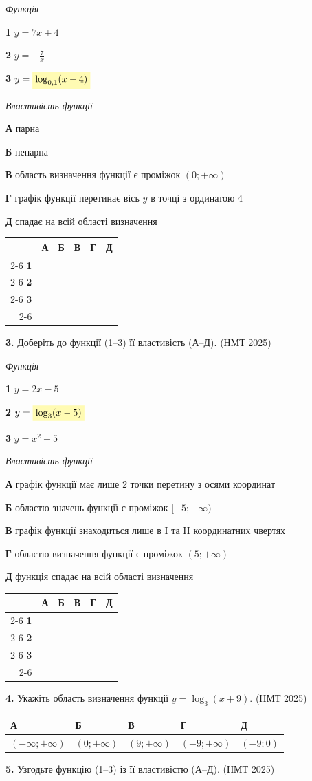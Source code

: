 \documentclass[14pt]{extarticle}
\newcommand{\answerGridSmall}{
    \begingroup
    \renewcommand{\arraystretch}{1.2} 
    \setlength{\tabcolsep}{5pt} 
    \begin{tabular}{r|c|c|c|c|c|}
         \multicolumn{1}{c}{} & \multicolumn{1}{c}{\textbf{А}} & \multicolumn{1}{c}{\textbf{Б}} & \multicolumn{1}{c}{\textbf{В}} & \multicolumn{1}{c}{\textbf{Г}} & \multicolumn{1}{c}{\textbf{Д}} \\ \cline{2-6}
         \textbf{1} & & & & & \\ \cline{2-6}
         \textbf{2} & & & & & \\ \cline{2-6}
         \textbf{3} & & & & & \\ \cline{2-6}
    \end{tabular}
    \endgroup
}
\newcommand{\matchingLayoutBottom}[2]{
    \noindent
    \begin{minipage}[t]{0.48\textwidth}
        #1
    \end{minipage}%
    \hfill
    \begin{minipage}[t]{0.48\textwidth}
        #2
    \end{minipage}
    
    \vspace{0.5cm}
    
    \noindent
    \answerGridSmall
}
\newcommand{\answerTable}[5]{
\begin{center}
\begin{tabular}{|*{5}{>{\centering\arraybackslash}m{2.8cm}|}}
\hline
\rule[-0.3cm]{0pt}{0.8cm}\textbf{А} & \textbf{Б} & \textbf{В} & \textbf{Г} & \textbf{Д} \\
\hline
\rule[-0.4cm]{0pt}{1.0cm}#1 & \rule[-0.4cm]{0pt}{1.0cm}#2 & \rule[-0.4cm]{0pt}{1.0cm}#3 & \rule[-0.4cm]{0pt}{1.0cm}#4 & \rule[-0.4cm]{0pt}{1.0cm}#5 \\
\hline
\end{tabular}
\end{center}
}
\newcommand{\nmtyear}[1]{\hfill{\small\color{yearcolor}(НМТ #1)}}
\begin{document}
\matchingLayoutBottom{\textit{Функція}

\textbf{1} \quad $y = 7x + 4$

\textbf{2} \quad $y = -\displaystyle\frac{7}{x}$

\textbf{3} \quad $y = \colorbox{yellow!30}{$\log_{0,1} (x - 4)$}$
}{
\textit{Властивість функції}

\textbf{А} \quad парна

\textbf{Б} \quad непарна

\textbf{В} \quad область визначення функції є проміжок $(0; +\infty)$

\textbf{Г} \quad графік функції перетинає вісь $y$ в точці з ординатою 4

\textbf{Д} \quad спадає на всій області визначення
}

\vspace{1cm}

\noindent\textbf{3.} Доберіть до функції (1--3) її властивість (А--Д). \nmtyear{2025}
\vspace{0.3cm}

\matchingLayoutBottom{\textit{Функція}

\textbf{1} \quad $y = 2x - 5$

\textbf{2} \quad $y = \colorbox{yellow!30}{$\log_3 (x - 5)$}$

\textbf{3} \quad $y = x^2 - 5$
}{
\textit{Властивість функції}

\textbf{А} \quad графік функції має лише 2 точки перетину з осями координат

\textbf{Б} \quad областю значень функції є проміжок $[-5; +\infty)$

\textbf{В} \quad графік функції знаходиться лише в I та II координатних чвертях

\textbf{Г} \quad областю визначення функції є проміжок $(5; +\infty)$

\textbf{Д} \quad функція спадає на всій області визначення
}

\vspace{1cm}

\noindent\textbf{4.} Укажіть область визначення функції $y = \log_3 (x + 9)$. \nmtyear{2025}
\vspace{0.3cm}

\answerTable{$(-\infty; +\infty)$}{$(0; +\infty)$}{$(9; +\infty)$}{$(-9; +\infty)$}{$(-9; 0)$}

\vspace{0.5cm}

\noindent\textbf{5.} Узгодьте функцію (1--3) із її властивістю (А--Д). \nmtyear{2025}
\vspace{0.3cm}
\end{document}
